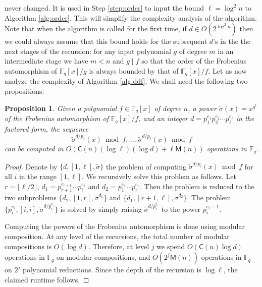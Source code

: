\documentclass[11pt]{article}
\theoremstyle{plain}
\newtheorem{proposition}[theorem]{Proposition}
\theoremstyle{definition}
\def\F{\ensuremath{\mathbb{F}}}
\def\MM{\ensuremath{\mathsf{M}}}
\def\CC{\ensuremath{\mathsf{C}}}
\begin{document}
never changed. It is used in Step \ref{step:order} to input the bound $\ell = \log^2n$ to Algorithm 
\ref{alg:order}. This will simplify the complexity analysis of the algorithm. Note that when the 
algorithm is called for the first time, if $d \in O(2^{\log^2n})$ then we could always assume that 
this bound holds for the subsequent $d$'s in the the next stages of the recursion: for any input 
polynomial $g$ of degree $m$ in an intermediate stage we have $m < n$ and $g \mid f$ so that the 
order of the Frobenius automorphism of $\F_q[x] / g$ is always bounded by that of $\F_q[x] / f$. Let 
us now analyze the complexity of Algorithm \ref{alg:ddf}. We shall need the following two 
propositions.
\begin{proposition}
	\label{prop:frobs}
	Given a polynomial $f \in \F_q[x]$ of degree $n$, a power $\tilde{\sigma}(x) = x^{q^t}$ of the 
	Frobenius automorphism of $\F_q[x] / f$, and an integer $d = p_1^{e_1} p_2^{e_2} \cdots 
	p_\ell^{e_\ell}$ in 
	the factored form, the sequence
	\begin{equation}
	\label{equ:frobs}
		\tilde{\sigma}^{d / p_1}(x) \bmod f, \dots, \tilde{\sigma}^{d / p_\ell}(x) \bmod f
	\end{equation}
	can be computed in $O(\CC(n)(\log \ell)(\log d) + \ell\MM(n))$ operations in $\F_q$.
\end{proposition}
\begin{proof}
	Denote by $\{ d, [1, \ell], \tilde{\sigma} \}$ the problem of computing $\tilde{\sigma}^{d / 
	p_i}(x) \bmod f$ for all $i$ in the range $[1, \ell]$. We recursively solve this problem as 
	follows. Let $r = \lfloor \ell / 2 \rfloor$, $d_1 = p_{r + 1}^{e_{r + 1}} \cdots 
	p_\ell^{e_\ell}$ and $d_2 = p_1^{e_1} \cdots p_r^{e_r}$. Then the problem is reduced to the 
	two subproblems $\{ d_2, [1, r], \tilde{\sigma}^{d_1} \}$ and $\{ d_1, [r + 1, \ell], 
	\tilde{\sigma}^{d_2} \}$. The problem $\{ p_i^{e_i}, [i, i], \tilde{\sigma}^{d / p_i^{e_i}} \}$ 
	is solved by simply raising $\tilde{\sigma}^{d / p_i^{e_i}}$ to the power $p_i^{e_i - 1}$.
	
	Computing the powers of the Frobenius automorphism is done using modular composition. At any 
	level of the recursions, the total number of modular compositions is $O(\log d)$. Therefore, at 
	level $j$ we spend $O(\CC(n) \log d)$ operations in $\F_q$ on modular compositions, and 
	$O(2^j\MM(n))$ operations in $\F_q$ on $2^j$ polynomial reductions. Since the depth of the 
	recursion is $\log \ell$, the claimed runtime follows.
\end{proof}
\end{document}
